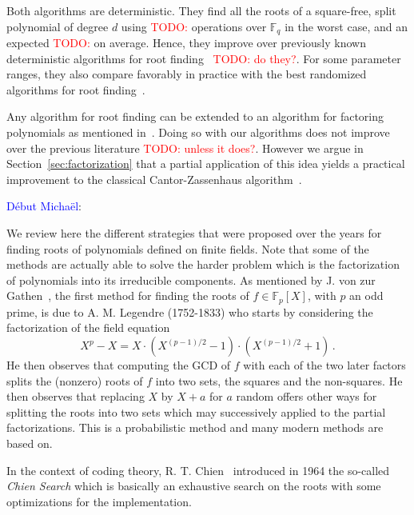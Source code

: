\documentclass{sig-alternate}
\newcommand{\ff}[1]{\mathbb{F}_{#1}}
\newcommand{\dd}{d}
\newcommand{\qq}{q}
\newcommand{\basef}{\ff{\qq}}
\newcounter{algo}
\newcommand{\todo}[1]{\textcolor{red}{TODO: #1}}
\newcommand{\comd}{\noindent \textcolor{blue}{D\'ebut Micha\"el}:}
\renewcommand{\paragraph}[1]{\smallskip\noindent{{\bf \rm #1.}}}
\begin{document}
Both algorithms are deterministic. They find all the roots of a
square-free, split polynomial of degree $\dd$ using \todo{} operations
over $\basef$ in the worst case, and an expected \todo{} on
average. Hence, they improve over previously known deterministic
algorithms for root finding~\cite{Shoup91b} \todo{do they?}. For some
parameter ranges, they also compare favorably in practice with the
best randomized algorithms for root finding~\cite{berl70,cantor1981}.

Any algorithm for root finding can be extended to an algorithm for
factoring polynomials as mentioned in~\cite{Rabin79}. Doing so with
our algorithms does not improve over the previous literature
\todo{unless it does?}. However we argue in
Section~\ref{sec:factorization} that a partial application of this
idea yields a practical improvement to the classical Cantor-Zassenhaus
algorithm~\cite{cantor1981}.



\comd 

\paragraph{Previous work:} We review here the different strategies that were proposed over the years for finding roots of polynomials defined on finite fields. Note that some of the methods are actually able to solve the harder problem which is the factorization of polynomials into its irreducible components. As mentioned by J. von zur Gathen~\cite{Gathen06}, the first method for finding the roots of $f \in \mathbb{F}_p[X]$, with $p$ an odd prime, is due to A. M. Legendre (1752-1833) who starts by considering the factorization of the field equation
$$X^{p}-X=X \cdot (X^{(p-1)/2}-1) \cdot (X^{(p-1)/2}+1)\,.$$
He then observes that computing the GCD of $f$ with each of the two later factors splits the (nonzero) roots of $f$ into two sets, the squares and the non-squares. He then observes that replacing $X$ by $X+a$ for $a$ random offers other ways for splitting the roots into two sets which may successively applied to the partial factorizations. This is a probabilistic method and many modern methods are based on.

In the context of coding theory, R. T. Chien~\cite{Chien64a} introduced in 1964 the so-called \emph{Chien Search} which is basically an exhaustive search on the roots with some optimizations for the implementation.
\end{document}
